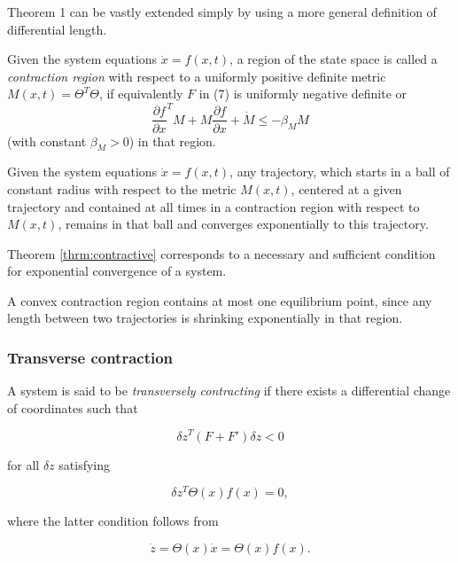\documentclass{article}
\newcounter{ct}
\begin{document}
Theorem 1 can be vastly extended simply by using a more general definition of differential length.


\begin{definition}
Given the system equations \(\dot{x} = f(x, t)\), a region of the state space is called a \textit{contraction region} with respect to a uniformly positive definite metric \( M(x, t) = \Theta^T \Theta \), if equivalently \( F \) in (7) is uniformly negative definite or  
\[
\frac{\partial f}{\partial x}^T M + M \frac{\partial f}{\partial x} + \dot{M} \leq -\beta_M M
\]
(with constant \( \beta_M > 0 \)) in that region.
\end{definition}

\begin{theorem}\label{thrm:contractive}
Given the system equations $\dot x = f(x,t)$, any trajectory, which starts in a ball of constant radius with respect to the metric $M(x,t)$, centered at a given trajectory and contained at all times in a contraction region with respect to $M(x,t)$,  remains in that ball and converges exponentially to this trajectory.
\end{theorem}

\begin{remark}
Theorem \ref{thrm:contractive} corresponds to a necessary and sufficient condition for exponential convergence of a system. 
\end{remark}

\begin{remark}
A convex contraction region contains at most one equilibrium point, since any length between two trajectories is shrinking exponentially in that region.
\end{remark}

\subsubsection{Transverse contraction}
\begin{definition} 
A system is said to be \textit{transversely contracting} if there exists a differential change of coordinates such that  

\[
\delta z^T (F + F') \delta z < 0
\]

for all \( \delta z \) satisfying  

\[
\delta z^T \Theta(x) f(x) = 0,
\]

where the latter condition follows from  

\[
\dot{z} = \Theta(x) \dot{x} = \Theta(x) f(x).
\]

\end{definition}
\end{document}
